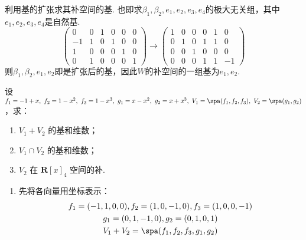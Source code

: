 \begin{exercise}
\begin{exgroup}
\begin{answer}
\begin{enumerate}
\begin{enumerate}
                                利用基的扩张求其补空间的基. 也即求$\beta_1,\beta_2,e_1,e_2,e_3,e_4$的极大无关组，其中$e_1,e_2,e_3,e_4$是自然基.
                                \[\begin{pmatrix}
                                        0  & 0 & 1 & 0 & 0 & 0 \\
                                        -1 & 1 & 0 & 1 & 0 & 0 \\
                                        1  & 0 & 0 & 0 & 1 & 0 \\
                                        0  & 1 & 0 & 0 & 0 & 1
                                    \end{pmatrix}\rightarrow
                                    \begin{pmatrix}1 & 0 & 0 & 0 & 1 & 0  \\
                 0 & 1 & 0 & 1 & 1 & 0  \\
                 0 & 0 & 1 & 0 & 0 & 0  \\
                 0 & 0 & 0 & 1 & 1 & -1
                                    \end{pmatrix}\]
                                则$\beta_1,\beta_2,e_1,e_2$即是扩张后的基，因此$W$的补空间的一组基为$e_1,e_2$.
                      \end{enumerate}
            \end{enumerate}
        \end{answer}
        \item 设 $f_1=-1+x,\ f_2=1-x^2,\ f_3=1-x^3,\ g_1=x-x^2,\ g_2=x+x^3,\ V_1=\spa(f_1,f_2,f_3),\ V_2=\spa(g_1,g_2)$，求：
        \begin{enumerate}
            \item $V_1+V_2$ 的基和维数；
            \item $V_1 \cap V_2$ 的基和维数；
            \item $V_2$ 在 $\mathbf{R}[x]_4$ 空间的补.
        \end{enumerate}
        \begin{answer}
            \begin{enumerate}
                \item 先将各向量用坐标表示：
                      \begin{gather*}
                          f_1=(-1,1,0,0),f_2=(1,0,-1,0),f_3=(1,0,0,-1) \\
                          g_1=(0,1,-1,0),g_2=(0,1,0,1) \\
                          V_1+V_2=\spa(f_1,f_2,f_3,g_1,g_2)

\end{gather*}
\end{enumerate}
\end{answer}
\end{exgroup}
\end{exercise}
